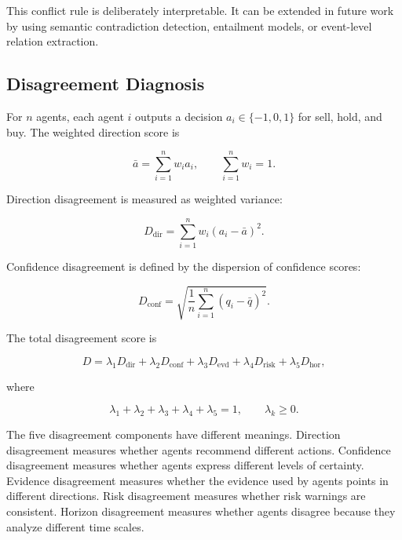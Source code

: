 \documentclass[14pt,a4paper]{extarticle}
\begin{document}
This conflict rule is deliberately interpretable. It can be extended in future work by using semantic contradiction detection, entailment models, or event-level relation extraction.

\subsection{Disagreement Diagnosis}

For $n$ agents, each agent $i$ outputs a decision $a_i \in \{-1,0,1\}$ for sell, hold, and buy. The weighted direction score is

\begin{equation}
\bar{a}=\sum_{i=1}^{n} w_i a_i ,
\qquad \sum_{i=1}^{n}w_i=1 .
\label{eq:direction-score}
\end{equation}

Direction disagreement is measured as weighted variance:

\begin{equation}
D_{\mathrm{dir}}=\sum_{i=1}^{n} w_i(a_i-\bar{a})^2 .
\label{eq:direction-disagreement}
\end{equation}

Confidence disagreement is defined by the dispersion of confidence scores:

\begin{equation}
D_{\mathrm{conf}}=\sqrt{\frac{1}{n}\sum_{i=1}^{n}(q_i-\bar{q})^2}.
\label{eq:confidence-disagreement}
\end{equation}

The total disagreement score is

\begin{equation}
D=
\lambda_1D_{\mathrm{dir}}+
\lambda_2D_{\mathrm{conf}}+
\lambda_3D_{\mathrm{evd}}+
\lambda_4D_{\mathrm{risk}}+
\lambda_5D_{\mathrm{hor}},
\label{eq:total-disagreement}
\end{equation}

where

\begin{equation}
\lambda_1+\lambda_2+\lambda_3+\lambda_4+\lambda_5=1,
\qquad
\lambda_k\geq0.
\label{eq:lambda}
\end{equation}

The five disagreement components have different meanings. Direction disagreement measures whether agents recommend different actions. Confidence disagreement measures whether agents express different levels of certainty. Evidence disagreement measures whether the evidence used by agents points in different directions. Risk disagreement measures whether risk warnings are consistent. Horizon disagreement measures whether agents disagree because they analyze different time scales.
\end{document}
